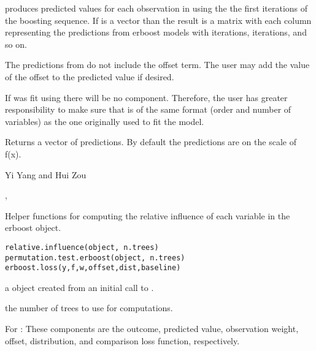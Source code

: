 \documentclass[a4paper]{book}
\begin{document}
%
\begin{Details}\relax
{} produces predicted values for each observation in  using the the first  iterations of the boosting sequence. If  is a vector than the result is a matrix with each column representing the predictions from erboost models with  iterations,  iterations, and so on.

The predictions from  do not include the offset term. The user may add the value of the offset to the predicted value if desired.

If  was fit using  there will be no
 component. Therefore, the user has greater responsibility to make
sure that  is of the same format (order and number of variables)
as the one originally used to fit the model.
\end{Details}
%
\begin{Value}

Returns a vector of predictions. By default the predictions are on the scale of f(x).
\end{Value}
%
\begin{Author}\relax
Yi Yang  and Hui Zou 
\end{Author}
%
\begin{SeeAlso}\relax
{}, 
\end{SeeAlso}
%
\begin{Description}\relax
Helper functions for computing the relative influence of each variable in the erboost object.
\end{Description}
%
\begin{Usage}
\begin{verbatim}
relative.influence(object, n.trees)
permutation.test.erboost(object, n.trees)
erboost.loss(y,f,w,offset,dist,baseline)
\end{verbatim}
\end{Usage}
%
\begin{Arguments}
\begin{ldescription}
\item[\code{object}] a  object created from an initial call to .
\item[\code{n.trees}]  the number of trees to use for computations.
\item[\code{y,f,w,offset,dist,baseline}] For : These components are the
outcome, predicted value, observation weight, offset, distribution, and comparison
loss function, respectively.
\end{ldescription}
\end{Arguments}
\end{document}
